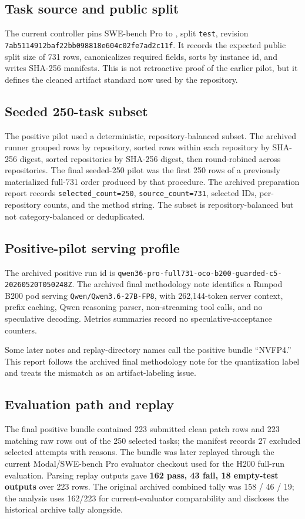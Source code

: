 \documentclass[11pt]{article}
\begin{document}
\subsection{Task source and public split}
The current controller pins SWE-bench Pro to , split \texttt{test}, revision \texttt{7ab5114912baf22bb098818e604c02fe7ad2c11f}. It records the expected public split size of 731 rows, canonicalizes required fields, sorts by instance id, and writes SHA-256 manifests. This is not retroactive proof of the earlier pilot, but it defines the cleaned artifact standard now used by the repository.

\subsection{Seeded 250-task subset}
The positive pilot used a deterministic, repository-balanced subset. The archived runner grouped rows by repository, sorted rows within each repository by SHA-256 digest, sorted repositories by SHA-256 digest, then round-robined across repositories. The final seeded-250 pilot was the first 250 rows of a previously materialized full-731 order produced by that procedure. The archived preparation report records \texttt{selected\_count=250}, \texttt{source\_count=731}, selected IDs, per-repository counts, and the method string. The subset is repository-balanced but not category-balanced or deduplicated.

\subsection{Positive-pilot serving profile}
The archived positive run id is \texttt{qwen36-pro-full731-oco-b200-guarded-c5-20260520T050248Z}. The archived final methodology note identifies a Runpod B200 pod serving \texttt{Qwen/Qwen3.6-27B-FP8}, with 262,144-token server context, prefix caching, Qwen reasoning parser, non-streaming tool calls, and no speculative decoding. Metrics summaries record no speculative-acceptance counters.

Some later notes and replay-directory names call the positive bundle ``NVFP4.'' This report follows the archived final methodology note for the quantization label and treats the mismatch as an artifact-labeling issue.

\subsection{Evaluation path and replay}
The final positive bundle contained 223 submitted clean patch rows and 223 matching raw rows out of the 250 selected tasks; the manifest records 27 excluded selected attempts with reasons. The bundle was later replayed through the current Modal/SWE-bench Pro evaluator checkout used for the H200 full-run evaluation. Parsing replay outputs gave \textbf{162 pass, 43 fail, 18 empty-test outputs} over 223 rows. The original archived combined tally was 158 / 46 / 19; the analysis uses 162/223 for current-evaluator comparability and discloses the historical archive tally alongside.
\end{document}
